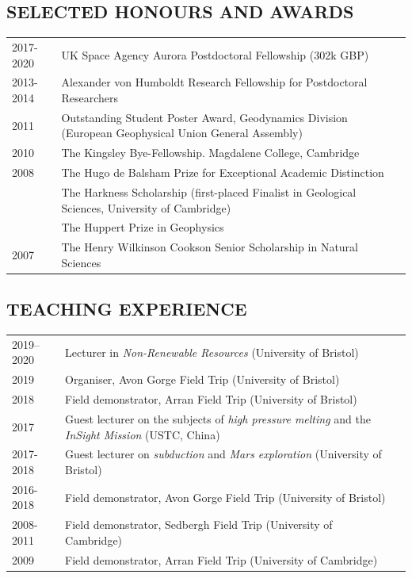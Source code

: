 \documentclass[11pt,twoside,a4paper]{article}
\begin{document}
\subsection*{SELECTED HONOURS AND AWARDS}

\vspace{-0.5em}
\begin{table}[!h]
\centering
\begin{tabular}{L{2cm} L{13cm} L{2cm}}
2017-2020 & UK Space Agency Aurora Postdoctoral Fellowship (302k GBP) & \\
2013-2014 & Alexander von Humboldt Research Fellowship for Postdoctoral Researchers & \\
2011 & Outstanding Student Poster Award, Geodynamics Division (European Geophysical Union General Assembly) & \\
2010 & The Kingsley Bye-Fellowship. Magdalene College, Cambridge & \\
2008 & The Hugo de Balsham Prize for Exceptional Academic Distinction & \\
 & The Harkness Scholarship (first-placed Finalist in Geological Sciences, University of Cambridge) & \\
 & The Huppert Prize in Geophysics &  \\
2007 & The Henry Wilkinson Cookson Senior Scholarship in Natural Sciences &
\end{tabular}
\end{table}
\vspace{-1.5em}

\clearpage
\subsection*{TEACHING EXPERIENCE}
\vspace{-0.5em}
\begin{table}[!h]
\centering
\begin{tabular}{L{2cm} L{13cm} L{2cm}}
  2019--2020 & Lecturer in \emph{Non-Renewable Resources} (University of Bristol) & \\
  2019 & Organiser, Avon Gorge Field Trip (University of Bristol) &\\
  2018 & Field demonstrator, Arran Field Trip (University of Bristol) & \\
  2017 \vfill & Guest lecturer on the subjects of \emph{high pressure melting} and the \emph{InSight Mission} (USTC, China) & \\
  2017-2018 & Guest lecturer on \emph{subduction} and \emph{Mars exploration} (University of Bristol) & \\
  2016-2018 & Field demonstrator, Avon Gorge Field Trip (University of Bristol) & \\
  2008-2011 & Field demonstrator, Sedbergh Field Trip (University of Cambridge) & \\
  2009 & Field demonstrator, Arran Field Trip (University of Cambridge) &
\end{tabular}
\end{table}
\vspace{-1.5em}
\end{document}
